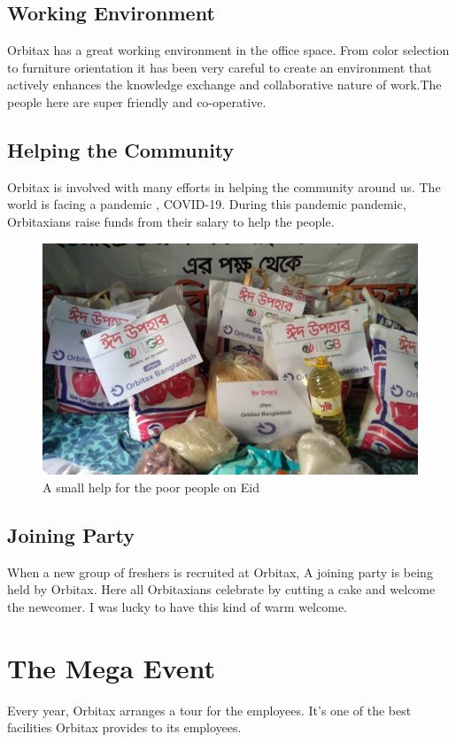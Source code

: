 \begin{flushleft}
\subsection{Working Environment}
Orbitax has a great working environment in the office space. From color selection to furniture orientation it has been very careful to create an environment that actively enhances the knowledge exchange and collaborative nature of work.The people here are super friendly and co-operative.



\subsection{ Helping the Community}
Orbitax is involved with many efforts in helping the community around us. The world is facing a pandemic , COVID-19. During this pandemic pandemic, Orbitaxians raise funds from their salary to help the people.
\begin{figure}[htbp]
\centerline{\includegraphics[scale=.5]{Figures/98344888_10157510430898510_3075632179519160320_n.jpg}}
\caption{A small help for the poor people on Eid}
\label{fig}
\end{figure}
 


\subsection{Joining Party}
When a new group of freshers is recruited at Orbitax, A joining party is being held by Orbitax. Here all Orbitaxians celebrate by cutting a cake and welcome the newcomer. I was lucky to have this kind of warm welcome.


\section{The Mega Event}
Every year, Orbitax arranges a tour for the employees. It’s one of the best facilities Orbitax provides to its employees.


\end{flushleft}
